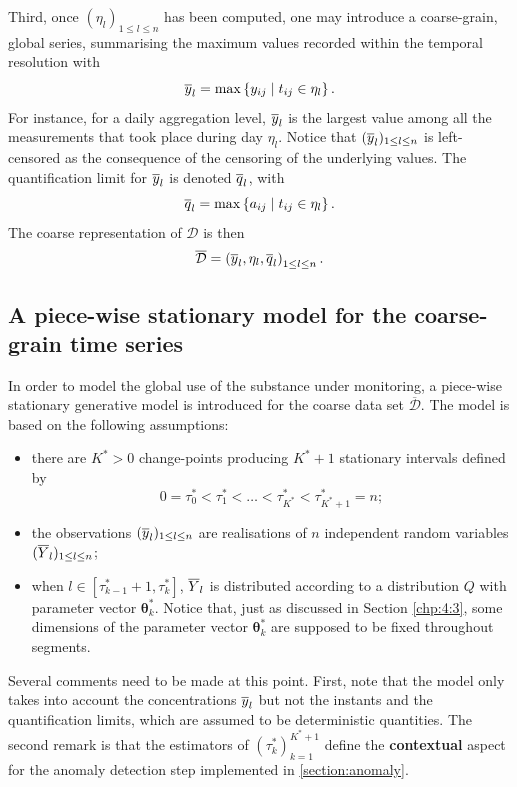 Third, once $(\eta_l)_{1\leq l\leq n}$ has been computed,  one may introduce a coarse-grain, global series, summarising the maximum values recorded within the temporal resolution with
\begin{equation}
\overline{y}_l=\max\left\{y_{ij} \mid t_{ij}\in\eta_l\right\}.
\end{equation}
For instance, for a daily aggregation level, $\overline{y}_l$ is the largest value among all the measurements that took place during day $\eta_l$. Notice that $(\overline{y}_l)_{1\leq l\leq n}$ is left-censored as the consequence of the censoring of the underlying values. The quantification limit for $\overline{y}_l$ is denoted $\overline{q}_l$, with
\begin{equation}
\overline{q}_l=\max\left\{a_{ij}\mid t_{ij}\in\eta_l\right\}.   
\end{equation}
The coarse representation of $\mathcal{D}$ is then
\begin{equation}
\overline{\mathcal{D}}=\left(\overline{y}_l, \eta_l, \overline{q}_l\right)_{1\leq l\leq n}.
\end{equation}

\subsection{A piece-wise stationary model for the coarse-grain time series}\label{subsection:pwsm}

In order to model the global use of the substance under monitoring, a piece-wise stationary generative model is introduced for the coarse data set $\overline{\mathcal{D}}$. The model is based on the following assumptions:
\begin{itemize}
    \item there are $K^*>0$ change-points producing $K^*+1$ stationary intervals defined by
\begin{equation*}
0=\tau_0^*<\tau_1^*<\ldots<\tau_{K^*}^*<\tau^*_{K^*+1}=n;    
\end{equation*}    
    \item the observations $(\overline{y}_l)_{1\leq l\leq n}$ are realisations of $n$ independent random variables $(\overline{Y}_l)_{1\leq l\leq n}$;
    \item when $l\in [\tau^*_{k-1}+1, \tau^*_{k}]$, $\overline{Y}_l$ is distributed according to a distribution $Q$ with parameter vector $\bm\theta^*_k$. Notice that, just as discussed in Section \ref{chp:4:3}, some dimensions of the parameter vector $\bm\theta^*_k$ are supposed to be fixed throughout segments. 
\end{itemize}
Several comments need to be made at this point. First, note that the model only takes into account the concentrations $\overline{y}_l$ but not the instants and the quantification limits, which are assumed to be deterministic quantities. The second remark is that the estimators of $(\tau^*_k)_{k=1}^{K^*+1}$ define the \textbf{contextual} aspect for the anomaly detection step implemented in \ref{section:anomaly}. 

